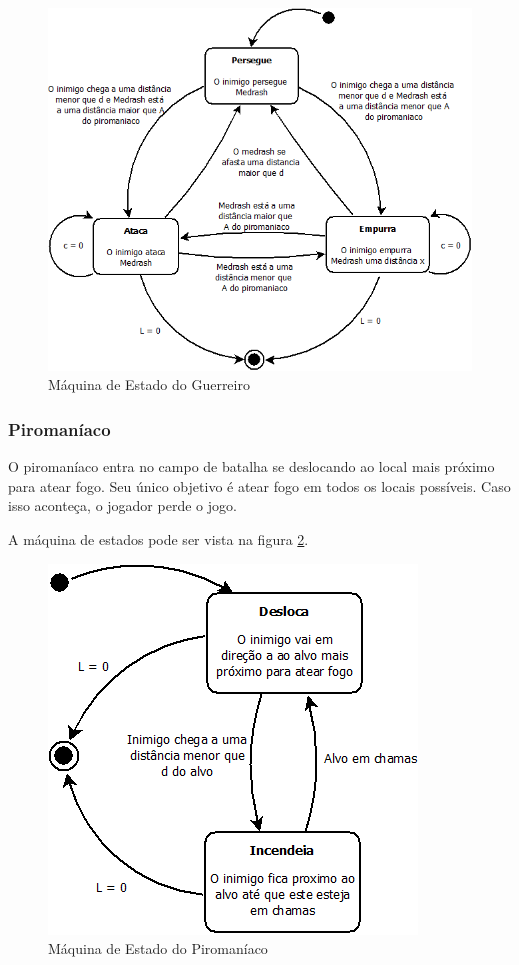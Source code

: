 \begin{figure}[!ht]
 \centering
 \includegraphics[scale=0.47]{ia_guerreiro.png}
 \caption{Máquina de Estado do Guerreiro}
 \label{fsm:guerreiro}
\end{figure}

\subsubsection{Piromaníaco}

O piromaníaco entra no campo de batalha se deslocando ao local mais
próximo para atear fogo. Seu único objetivo é atear fogo em todos os
locais possíveis. Caso isso aconteça, o jogador perde o jogo.

A máquina de estados pode ser vista na figura \ref{fsm:piromaniaco}.

\begin{figure}[!ht]
 \centering
 \includegraphics[scale=0.5]{ia_piromaniaco.png}
 \caption{Máquina de Estado do Piromaníaco}
 \label{fsm:piromaniaco}
\end{figure}

